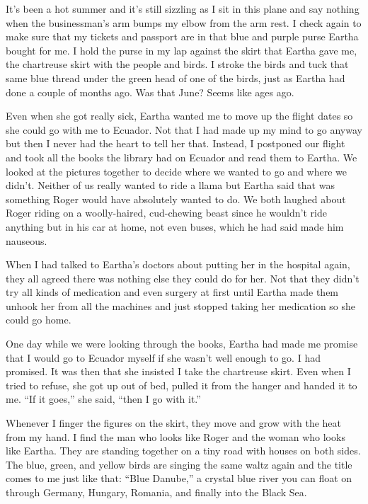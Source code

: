 \documentclass[
]{article}
\begin{document}
It's been a hot summer and it's still sizzling as I sit in this plane
and say nothing when the busi­nessman's arm bumps my elbow from the arm
rest. I check again to make sure that my tickets and passport are in
that blue and purple purse Eartha bought for me. I hold the purse in my
lap against the skirt that Eartha gave me, the chartreuse skirt with the
people and birds. I stroke the birds and tuck that same blue thread
under the green head of one of the birds, just as Eartha had done a
couple of months ago. Was that June? Seems like ages ago.

Even when she got really sick, Eartha wanted me to move up the flight
dates so she could go with me to Ecuador. Not that I had made up my mind
to go anyway but then I never had the heart to tell her that. Instead, I
postponed our flight and took all the books the library had on Ecuador
and read them to Eartha. We looked at the pictures together to decide
where we wanted to go and where we didn't. Neither of us really wanted
to ride a llama but Eartha said that was something Roger would have
absolutely wanted to do. We both laughed about Roger riding on a
woolly-haired, cud-chewing beast since he wouldn't ride anything but in
his car at home, not even buses, which he had said made him nauseous.

When I had talked to Eartha's doctors about putting her in the hospital
again, they all agreed there was nothing else they could do for her. Not
that they didn't try all kinds of medication and even surgery at first
until Eartha made them unhook her from all the machines and just stopped
taking her medication so she could go home.

One day while we were looking through the books, Eartha had made me
promise that I would go to Ecuador myself if she wasn't well enough to
go. I had promised. It was then that she insisted I take the chartreuse
skirt. Even when I tried to refuse, she got up out of bed, pulled it
from the hanger and handed it to me. ``If it goes,'' she said, ``then I
go with it.''

Whenever I finger the figures on the skirt, they move and grow with the
heat from my hand. I find the man who looks like Roger and the woman who
looks like Eartha. They are standing together on a tiny road with houses
on both sides. The blue, green, and yellow birds are singing the same
waltz again and the title comes to me just like that: ``Blue Danube,'' a
crystal blue river you can float on through Germany, Hungary, Romania,
and finally into the Black Sea.
\end{document}
